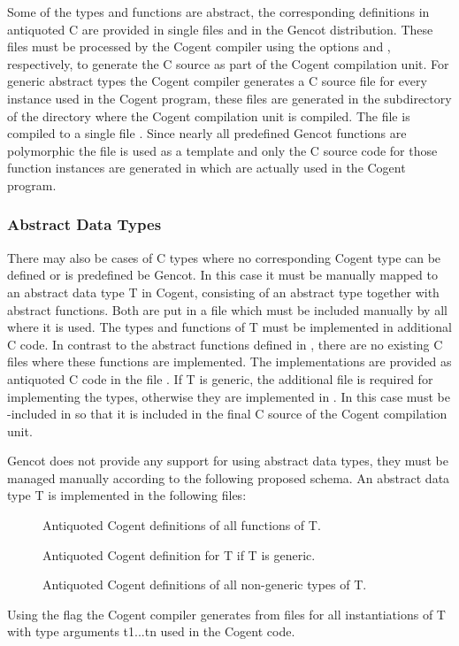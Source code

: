 Some of the types and functions are abstract, the corresponding definitions in antiquoted C are provided in single
files  and  in the Gencot distribution. These files must be processed by the Cogent 
compiler using the options  and , respectively, to generate the C source 
as part of the Cogent compilation unit. For generic abstract types the Cogent compiler generates a C source file
for every instance used in the Cogent program, these files are generated in the subdirectory  of the
directory where the Cogent compilation unit is compiled. The file  is compiled to a single file 
. Since nearly all predefined Gencot functions are polymorphic the file 
is used as a template and only the C source code for those function instances are generated in 
which are actually used in the Cogent program.

\subsubsection{Abstract Data Types}

There may also be cases of C types where no corresponding Cogent type can be defined or is predefined be Gencot.
In this case it must be manually mapped to an 
abstract data type T in Cogent, consisting of an abstract type together with abstract functions. Both are put in 
a file  which must be included manually by all  where it is used. The types and 
functions of T must be implemented in additional C code. In contrast to the abstract functions defined in 
,
there are no existing C files where these functions are implemented. The implementations are provided as antiquoted C
code in the file . If T is generic, the additional file  is required for 
implementing the types, otherwise they are implemented in . In this case  must be -included
in  so that it is included in the final C source of the Cogent compilation unit.

Gencot does not provide any support for using abstract data types, they must be managed manually according to the following
proposed schema. An abstract data type T is implemented in the following files:
\begin{description}
\item[] Antiquoted Cogent definitions of all functions of T. 
\item[] Antiquoted Cogent definition for T if T is generic.
\item[] Antiquoted Cogent definitions of all non-generic types of T.
\end{description}
Using the flag  the Cogent compiler generates from  files  for all 
instantiations of T with type arguments t1...tn used in the Cogent code.

